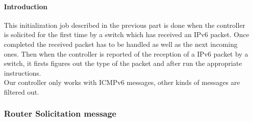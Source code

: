 \documentclass{article}
\begin{document}
\paragraph{Introduction}
This initialization job described in the previous part is done when
the controller is solicited for the first time by a switch which has
received an IPv6 packet. Once completed the received packet has to be
handled as well as the next incoming ones. Then when the controller
is reported of the reception of a IPv6 packet by a switch, it firsts
figures out the type of the packet and after run the appropriate
instructions.\\
Our controller only works with ICMPv6 messages, other kinds of
messages are filtered out.

\subsubsection{Router Solicitation message}
\end{document}
